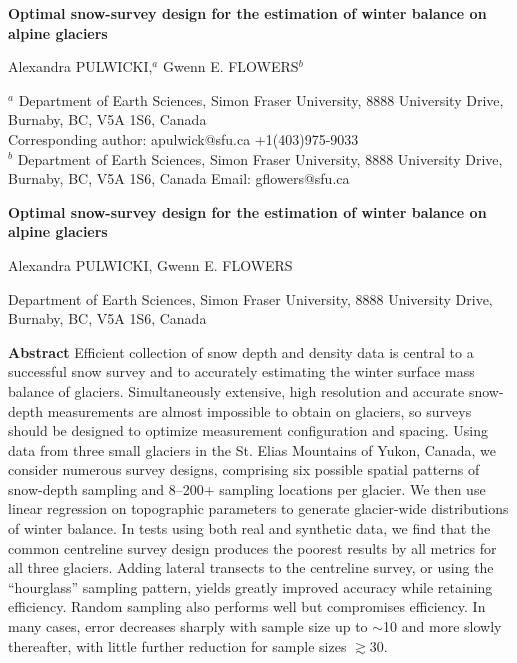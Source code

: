 \documentclass{article}
\begin{document}
\begin{center}
{\Large \textbf{Optimal snow-survey design for the estimation of winter balance on alpine glaciers}}
\vspace{0.5cm} 

\noindent Alexandra PULWICKI,$^a$ Gwenn E. FLOWERS$^b$
\vspace{0.5cm} 
\end{center}

\noindent $^a$ Department of Earth Sciences, Simon Fraser University, 8888 University Drive, Burnaby, BC, V5A 1S6, Canada \\
Corresponding author: apulwick@sfu.ca +1(403)975-9033\\
\noindent  $^b$ Department of Earth Sciences, Simon Fraser University, 8888 University Drive, Burnaby, BC, V5A 1S6, Canada  Email: gflowers@sfu.ca
\vspace{0.5cm} 

\pagebreak

\begin{center}
{\Large \textbf{Optimal snow-survey design for the estimation of winter balance on alpine glaciers}}
\vspace{0.5cm} 

\noindent Alexandra PULWICKI, Gwenn E. FLOWERS
\vspace{0.3cm} 
\end{center}

\noindent  Department of Earth Sciences, Simon Fraser University, 8888 University Drive, Burnaby, BC, V5A 1S6, Canada \\
\vspace{0.5cm} 

\noindent \textbf{Abstract} Efficient collection of snow depth and density data is central to a successful snow survey and to accurately estimating  the winter surface mass balance of glaciers. Simultaneously extensive, high resolution and accurate snow-depth measurements are almost impossible to obtain on glaciers, so surveys should be designed to optimize measurement configuration and spacing. 
Using data from three small glaciers in the St. Elias Mountains of Yukon, Canada,
we consider numerous survey designs, comprising six possible spatial patterns of snow-depth sampling and 8--200+  sampling locations per glacier. We then use linear regression on topographic parameters to generate glacier-wide distributions of winter balance. In tests using both real and synthetic data, we find that the common centreline survey design produces the poorest results by all metrics for all three glaciers. Adding lateral transects to the centreline survey, or using the ``hourglass'' sampling pattern, yields greatly improved accuracy while retaining efficiency. Random sampling also performs well but compromises efficiency.  
In many cases, error decreases sharply with sample size up to $\sim$10 and more slowly thereafter, with little further reduction for sample sizes $\gtrsim 30$. 
\end{document}
